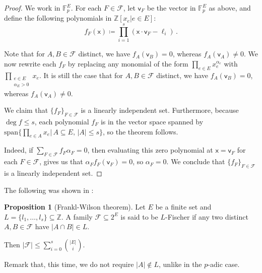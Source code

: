 \documentclass[12pt]{amsart}
\theoremstyle{definition}
\newtheorem{prop}[thm]{Proposition}
\newcommand{\Z}{\mathbb{Z}}
\newcommand{\F}{\mathbb{F}}
\newcommand{\FF}{\mathcal F}
\newcommand{\vv}{\mathsf{v}}
\newcommand{\vx}{\mathsf{x}}
\newcommand{\spn}{\mathrm{span}}
\begin{document}
\begin{proof}
We work in $\F_p^E$.
For each $F \in \FF$, let $\vv_F$ be the vector in $\F_p^E$ as above, and define the following polynomials in $\Z[x_e | e \in E]$:
$$f_F(\vx) \coloneqq \prod_{i = 1}^s (\vx \cdot \vv_F - \ell_i ) \, .$$

Note that for $A, B \in \FF$ distinct, we have $f_A(\vv_B) = 0$, whereas $f_A(\vv_A) \neq 0$.
We now rewrite each $f_F$ by replacing any monomial of the form $\prod_{e\in E}x_e^{\alpha_e}$ with $\prod_{\substack{e\in E\\ \alpha_E > 0}}x_e$.
It is still the case that for $A, B \in \FF$ distinct, we have $f_A(\vv_B) = 0$, whereas $f_A(\vv_A) \neq 0$.

We claim that $\{ f_F \}_{F \in \FF}$ is a linearly independent set.
Furthermore, because $\deg f \leq s$, each polynomial $f_F$ is in the vector space spanned by $\spn\{\prod_{e \in A} x_e | \, A \subseteq E, \, |A| \leq s \}$, so the theorem follows.

Indeed, if $\sum_{F \in \FF} f_F \alpha_F =0$, then evaluating this zero polynomial at $\vx = \vv_F $ for each $F \in \FF$, gives us that $\alpha_F f_F(\vv_F) = 0$, so $\alpha_F = 0$. 
We conclude that $\{ f_F \}_{F \in \FF}$ is a linearly independent set.
\end{proof}

The following was shown in \cite{hsieh1975intersection}:

\begin{prop}[Frankl-Wilson theorem]
Let $E$ be a finite set and $L = \{l_1, \ldots , l_s\} \subseteq \Z$.
A family $\FF \subseteq 2^E$ is said to be $L$-Fischer if any two distinct $A, B \in \FF $ have $|A\cap B| \in L$.

Then $|\FF| \leq \sum_{i=0}^s \binom{|E|}{i}$.
\end{prop}

Remark that, this time, we do not require $|A|\not\in L$, unlike in the $p$-adic case.
\end{document}
